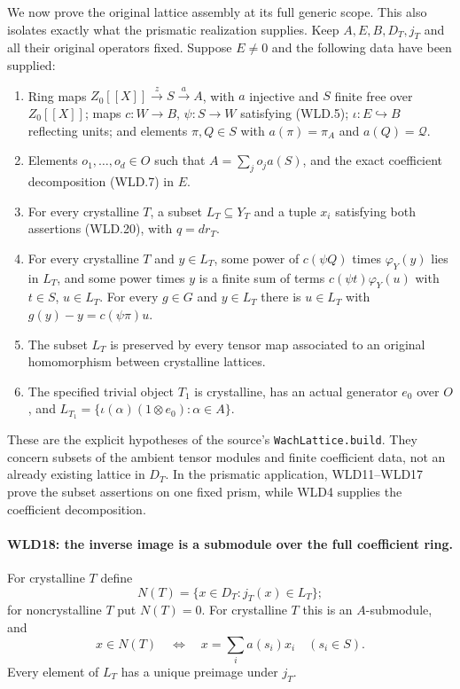 We now prove the original lattice assembly at its full generic scope.
This also isolates exactly what the prismatic realization supplies.
Keep $A,E,B,D_T,j_T$ and all their original operators fixed.
Suppose $E\ne0$ and the following data have been supplied:
\begin{enumerate}
 \item Ring maps $Z_0[[X]]\xrightarrow{z}S\xrightarrow{a}A$,
 with $a$ injective and $S$ finite free over $Z_0[[X]]$;
 maps $c:W\to B$, $\psi:S\to W$ satisfying (WLD.5);
 $\iota:E\hookrightarrow B$ reflecting units;
 and elements $\pi,Q\in S$ with
 $a(\pi)=\pi_A$ and $a(Q)=\mathcal Q$.
 \item Elements $o_1,\ldots,o_d\in O$ such that
 $A=\sum_j o_ja(S)$, and the exact coefficient decomposition
 (WLD.7) in $E$.
 \item For every crystalline $T$, a subset $L_T\subseteq Y_T$
 and a tuple $x_i$ satisfying both assertions (WLD.20), with
 $q=dr_T$.
 \item For every crystalline $T$ and $y\in L_T$, some power
 of $c(\psi Q)$ times $\varphi_Y(y)$ lies in $L_T$, and some
 power times $y$ is a finite sum of terms
 $c(\psi t)\varphi_Y(u)$ with $t\in S$, $u\in L_T$.
 For every $g\in G$ and $y\in L_T$ there is $u\in L_T$ with
 $g(y)-y=c(\psi\pi)u$.
 \item The subset $L_T$ is preserved by every tensor map
 associated to an original homomorphism between crystalline lattices.
 \item The specified trivial object $T_1$ is crystalline, has an
 actual generator $e_0$ over $O$, and
 $L_{T_1}=\{\iota(\alpha)(1\otimes e_0):\alpha\in A\}$.
\end{enumerate}
These are the explicit hypotheses of the source's
\texttt{Wach\allowbreak Lattice.\allowbreak build}. They concern subsets of the ambient tensor
modules and finite coefficient data, not an already existing lattice
in $D_T$. In the prismatic application, WLD11--WLD17 prove the
subset assertions on one fixed prism, while WLD4 supplies the
coefficient decomposition.

\paragraph{WLD18: the inverse image is a submodule over the full coefficient ring.}
\label{claim:WLD18}
For crystalline $T$ define
\[
           N(T)=\{x\in D_T:j_T(x)\in L_T\};
\]
for noncrystalline $T$ put $N(T)=0$. For crystalline $T$ this is
an $A$-submodule, and
\[
 x\in N(T)\quad\Longleftrightarrow\quad
                       x=\sum_i a(s_i)x_i\quad(s_i\in S).
                                                               \tag{WLD.21}
\]
Every element of $L_T$ has a unique preimage under $j_T$.

